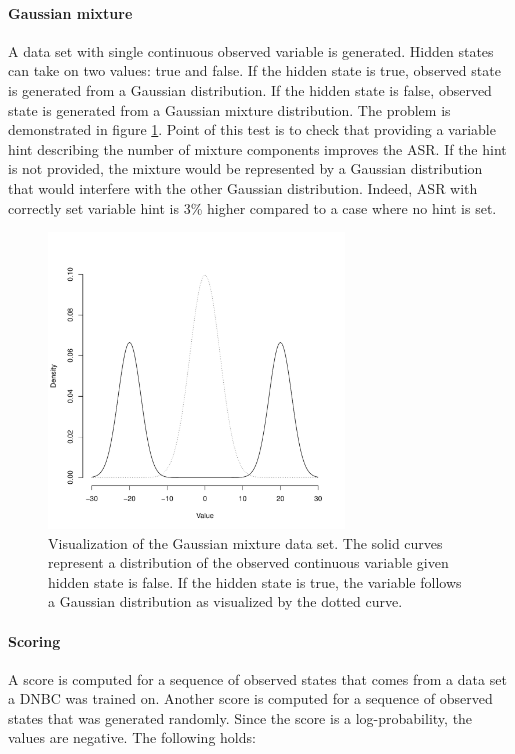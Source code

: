 \documentclass[thesis=B,english]{FITthesis}[2012/06/26]
\begin{document}
\paragraph{Gaussian mixture}
A data set with single continuous observed variable is generated. Hidden states can take on two values: true and false. If the hidden state is true, observed state is generated from a Gaussian distribution. If the hidden state is false, observed state is generated from a Gaussian mixture distribution. The problem is demonstrated in figure \ref{fig:gaussian_data_set}. Point of this test is to check that providing a variable hint describing the number of mixture components improves the ASR. If the hint is not provided, the mixture would be represented by a Gaussian distribution that would interfere with the other Gaussian distribution. Indeed, ASR with correctly set variable hint is 3\% higher compared to a case where no hint is set.

\begin{figure}
	\centering
	\includegraphics[width=0.7\textwidth]{gaussian_data_set}
	\caption{Visualization of the Gaussian mixture data set. The solid curves represent a distribution of the observed continuous variable given hidden state is false. If the hidden state is true, the variable follows a Gaussian distribution as visualized by the dotted curve.}
	\label{fig:gaussian_data_set}
\end{figure}

\paragraph{Scoring}
A score is computed for a sequence of observed states that comes from a data set a DNBC was trained on. Another score is computed for a sequence of observed states that was generated randomly. Since the score is a log-probability, the values are negative. The following holds:
\end{document}
